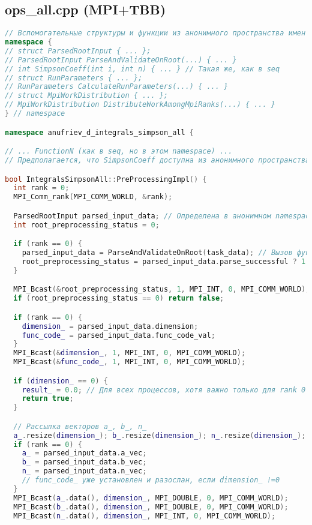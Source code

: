 \documentclass[a4paper,12pt]{article}
\begin{document}
\subsection{ops\_all.cpp (MPI+TBB)}
\begin{lstlisting}[language=C++, caption=Ключевые функции из ops\_all.cpp, basicstyle=\ttfamily\tiny]
// Вспомогательные структуры и функции из анонимного пространства имен
namespace { 
// struct ParsedRootInput { ... };
// ParsedRootInput ParseAndValidateOnRoot(...) { ... }
// int SimpsonCoeff(int i, int n) { ... } // Такая же, как в seq
// struct RunParameters { ... };
// RunParameters CalculateRunParameters(...) { ... }
// struct MpiWorkDistribution { ... };
// MpiWorkDistribution DistributeWorkAmongMpiRanks(...) { ... }
} // namespace

namespace anufriev_d_integrals_simpson_all {

// ... FunctionN (как в seq, но в этом namespace) ...
// Предполагается, что SimpsonCoeff доступна из анонимного пространства имен

bool IntegralsSimpsonAll::PreProcessingImpl() {
  int rank = 0;
  MPI_Comm_rank(MPI_COMM_WORLD, &rank);

  ParsedRootInput parsed_input_data; // Определена в анонимном namespace
  int root_preprocessing_status = 0;

  if (rank == 0) {
    parsed_input_data = ParseAndValidateOnRoot(task_data); // Вызов функции из anonymous namespace
    root_preprocessing_status = parsed_input_data.parse_successful ? 1 : 0;
  }

  MPI_Bcast(&root_preprocessing_status, 1, MPI_INT, 0, MPI_COMM_WORLD);
  if (root_preprocessing_status == 0) return false;

  if (rank == 0) {
    dimension_ = parsed_input_data.dimension;
    func_code_ = parsed_input_data.func_code_val;
  }
  MPI_Bcast(&dimension_, 1, MPI_INT, 0, MPI_COMM_WORLD);
  MPI_Bcast(&func_code_, 1, MPI_INT, 0, MPI_COMM_WORLD);

  if (dimension_ == 0) {
    result_ = 0.0; // Для всех процессов, хотя важно только для rank 0
    return true;
  }

  // Рассылка векторов a_, b_, n_
  a_.resize(dimension_); b_.resize(dimension_); n_.resize(dimension_);
  if (rank == 0) {
    a_ = parsed_input_data.a_vec;
    b_ = parsed_input_data.b_vec;
    n_ = parsed_input_data.n_vec;
    // func_code_ уже установлен и разослан, если dimension_ !=0
  }
  MPI_Bcast(a_.data(), dimension_, MPI_DOUBLE, 0, MPI_COMM_WORLD);
  MPI_Bcast(b_.data(), dimension_, MPI_DOUBLE, 0, MPI_COMM_WORLD);
  MPI_Bcast(n_.data(), dimension_, MPI_INT, 0, MPI_COMM_WORLD);
  

\end{lstlisting}
\end{document}
